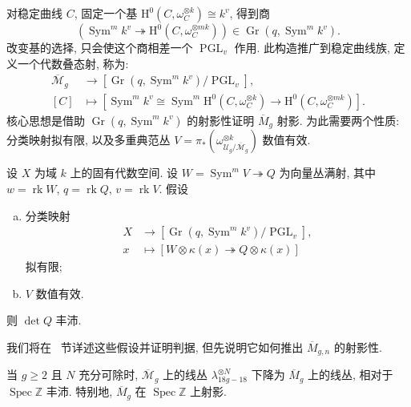 对稳定曲线 $C$, 固定一个基 $\mathrm H^0(C,\allowbreak \omega_C^{\otimes k})\cong k^v$, 得到商
\[
(\operatorname{Sym}^mk^v\twoheadrightarrow\mathrm H^0(C,\omega_C^{\otimes mk}))\in\operatorname{Gr}(q,\operatorname{Sym}^mk^v).
\]
改变基的选择, 只会使这个商相差一个 $\operatorname{PGL}_v$ 作用. 此构造推广到稳定曲线族, 定义一个代数叠态射, 称为:
\[
\begin{aligned}
\overline{\mathcal M}_g&\longrightarrow[\operatorname{Gr}(q,\operatorname{Sym}^mk^v)/\operatorname{PGL}_v],\\
[C]&\longmapsto[\operatorname{Sym}^mk^v\cong\operatorname{Sym}^m\mathrm H^0(C,\omega_C^{\otimes k})\longrightarrow\mathrm H^0(C,\omega_C^{\otimes mk})].
\end{aligned}
\]
核心思想是借助 $\operatorname{Gr}(q,\allowbreak \operatorname{Sym}^mk^v)$ 的射影性证明 $\overline M_g$ 射影. 为此需要两个性质: 分类映射拟有限, 以及多重典范丛 $V=\pi_*(\omega_{\mathcal U_g/\overline{\mathcal M}_g}^{\otimes k})$ 数值有效.
\begin{theorem}\label{src:6.9.2}
设 $X$ 为域 $k$ 上的固有代数空间. 设 $W=\operatorname{Sym}^mV\twoheadrightarrow Q$ 为向量丛满射, 其中 $w=\operatorname{rk}W$, $q=\operatorname{rk}Q$, $v=\operatorname{rk}V$. 假设
\begin{enumerate}[(a)]
\item 分类映射
\[
\begin{aligned}
X&\longrightarrow[\operatorname{Gr}(q,\operatorname{Sym}^mk^v)/\operatorname{PGL}_v],\\
x&\longmapsto[W\otimes\kappa(x)\twoheadrightarrow Q\otimes\kappa(x)]
\end{aligned}
\]
拟有限;
\item $V$ 数值有效.
\end{enumerate}
则 $\det Q$ 丰沛.
\end{theorem}
我们将在~ 节详述这些假设并证明判据, 但先说明它如何推出 $\overline M_{g,\allowbreak n}$ 的射影性.
\begin{theorem}\label{src:6.9.3}
当 $g\geq2$ 且 $N$ 充分可除时, $\overline{\mathcal M}_g$ 上的线丛 $\lambda_{18g-18}^{\otimes N}$ 下降为 $\overline M_g$ 上的线丛, 相对于 $\operatorname{Spec}\mathbb Z$ 丰沛. 特别地, $\overline M_g$ 在 $\operatorname{Spec}\mathbb Z$ 上射影.
\end{theorem}
